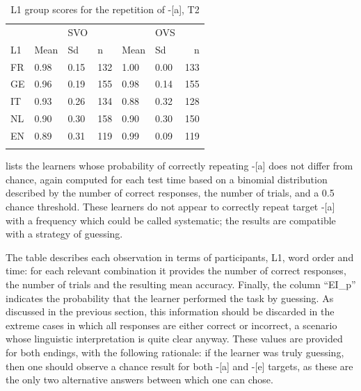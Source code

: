\begin{table}
    \begin{tabularx}{\textwidth}{XXXXXXr}
    \lsptoprule
    &  & {SVO} && & {OVS} &\\
    L1 & Mean & Sd & n & Mean & Sd & n\\
    \midrule
    FR & 0.98 & 0.15 & 132 & 1.00 & 0.00 & 133\\
    GE & 0.96 & 0.19 & 155 & 0.98 & 0.14 & 155\\
    IT & 0.93 & 0.26 & 134 & 0.88 & 0.32 & 128\\
    NL & 0.90 & 0.30 & 158 & 0.90 & 0.30 & 150\\
    EN & 0.89 & 0.31 & 119 & 0.99 & 0.09 & 119\\
    \lspbottomrule
    \end{tabularx}
    \caption{L1 group scores for the repetition of -[a], T2}
    \label{tab:04:8}
\end{table}

 lists the learners whose probability of correctly repeating -[a] does not differ from chance, again computed for each test time based on a binomial distribution described by the number of correct responses, the number of trials, and a 0.5 chance threshold. These learners do not appear to correctly repeat target -[a] with a frequency which could be called systematic; the results are compatible with a strategy of guessing.

The table describes each observation in terms of participants, L1, word order and time: for each relevant combination it provides the number of correct responses, the number of trials and the resulting mean accuracy. Finally, the column “EI\_p” indicates the probability that the learner performed the task by guessing. As discussed in the previous section, this information should be discarded in the extreme cases in which all responses are either correct or incorrect, a scenario whose linguistic interpretation is quite clear anyway. These values are provided for both endings, with the following rationale: if the learner was truly guessing, then one should observe a chance result for both -[a] and -[e] targets, as these are the only two alternative answers between which one can chose.

